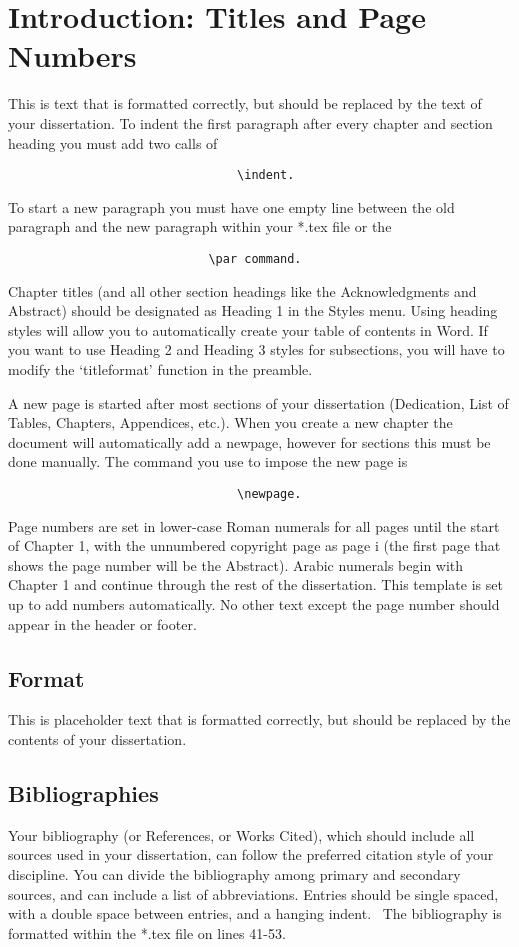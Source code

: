 \documentclass[12pt]{report}
\begin{document}
\chapter{Introduction: Titles and Page Numbers}
\indent\indent This is text that is formatted correctly, but should be replaced by the text of your dissertation. To indent the first paragraph after every chapter and section heading you must add two calls of
\begin{verbatim}
                                \indent.
\end{verbatim}
To start a new paragraph you must have one empty line between the old paragraph and the new paragraph within your *.tex file or the 
\begin{verbatim}
                            \par command.
\end{verbatim}
\par
Chapter titles (and all other section headings like the Acknowledgments and Abstract) should be designated as Heading 1 in the Styles menu. 
Using heading styles will allow you to automatically create your table of contents in Word. If you want to use Heading 2 and Heading 3 styles for subsections, you will have to modify the `titleformat' function in the preamble.

A new page is started after most sections of your dissertation (Dedication, List of Tables, Chapters, Appendices, etc.). When you create a new chapter the document will automatically add a newpage, however for sections this must be done manually. The command you use to impose the new page is
\begin{verbatim}
                                \newpage.
\end{verbatim}  
Page numbers are set in lower-case Roman numerals for all pages until the start of Chapter 1, with the unnumbered copyright page as page i (the first page that shows the page number will be the Abstract). Arabic numerals begin with Chapter 1 and continue through the rest of the dissertation. This template is set up to add numbers automatically. No other text except the page number should appear in the header or footer.


\section{Format}
\indent\indent This is placeholder text that is formatted correctly, but should be replaced by the contents of your dissertation.
\section{Bibliographies}
\indent\indent Your bibliography (or References, or Works Cited), which should include all sources used in your dissertation, can follow the preferred citation style of your discipline. You can divide the bibliography among primary and secondary sources, and can include a list of abbreviations. Entries should be single spaced, with a double space between entries, and a hanging indent.~\cite{schaffner_temporal_2014, alma991013205769704921} The bibliography is formatted within the *.tex file on lines 41-53.
\newpage
\end{document}
